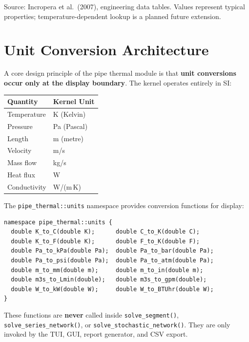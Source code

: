 \documentclass[11pt]{article}
\begin{document}
\noindent
Source: Incropera et al.\ (2007), engineering data tables.  Values represent
typical properties; temperature-dependent lookup is a planned future extension.

\section{Unit Conversion Architecture}

A core design principle of the pipe thermal module is that \textbf{unit
conversions occur only at the display boundary}.  The kernel operates
entirely in SI:

\begin{center}
\begin{tabular}{ll}
\toprule
Quantity & Kernel Unit \\
\midrule
Temperature  & K (Kelvin) \\
Pressure     & Pa (Pascal) \\
Length        & m (metre) \\
Velocity     & m/s \\
Mass flow    & kg/s \\
Heat flux    & W \\
Conductivity & W/(m\,K) \\
\bottomrule
\end{tabular}
\end{center}

\noindent
The \texttt{pipe\_thermal::units} namespace provides conversion functions
for display:

\begin{lstlisting}
namespace pipe_thermal::units {
  double K_to_C(double K);      double C_to_K(double C);
  double K_to_F(double K);      double F_to_K(double F);
  double Pa_to_kPa(double Pa);  double Pa_to_bar(double Pa);
  double Pa_to_psi(double Pa);  double Pa_to_atm(double Pa);
  double m_to_mm(double m);     double m_to_in(double m);
  double m3s_to_Lmin(double);   double m3s_to_gpm(double);
  double W_to_kW(double W);     double W_to_BTUhr(double W);
}
\end{lstlisting}

These functions are \textbf{never} called inside \texttt{solve\_segment()},
\texttt{solve\_series\_network()}, or \texttt{solve\_stochastic\_network()}.
They are only invoked by the TUI, GUI, report generator, and CSV export.
\end{document}
